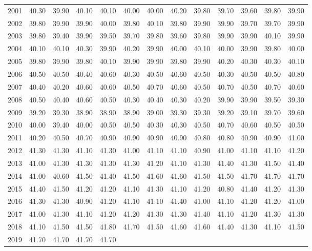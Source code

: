 \begin{longtable}{rrrrrrrrrrrrr}
  2001 & 40.30 & 39.90 & 40.10 & 40.10 & 40.00 & 40.00 & 40.20 & 39.80 & 39.70 & 39.60 & 39.80 & 39.90 \\ 
  2002 & 39.80 & 39.90 & 39.90 & 40.00 & 39.80 & 40.10 & 39.80 & 39.90 & 39.90 & 39.70 & 39.70 & 39.90 \\ 
  2003 & 39.80 & 39.40 & 39.90 & 39.50 & 39.70 & 39.80 & 39.60 & 39.80 & 39.90 & 39.90 & 40.10 & 39.90 \\ 
  2004 & 40.10 & 40.10 & 40.30 & 39.90 & 40.20 & 39.90 & 40.00 & 40.10 & 40.00 & 39.90 & 39.80 & 40.00 \\ 
  2005 & 39.80 & 39.90 & 39.80 & 40.10 & 39.90 & 39.90 & 39.80 & 39.90 & 40.20 & 40.30 & 40.30 & 40.10 \\ 
  2006 & 40.50 & 40.50 & 40.40 & 40.60 & 40.30 & 40.50 & 40.60 & 40.50 & 40.30 & 40.50 & 40.50 & 40.80 \\ 
  2007 & 40.40 & 40.20 & 40.60 & 40.60 & 40.50 & 40.70 & 40.60 & 40.50 & 40.70 & 40.50 & 40.70 & 40.60 \\ 
  2008 & 40.50 & 40.40 & 40.60 & 40.50 & 40.30 & 40.40 & 40.30 & 40.20 & 39.90 & 39.90 & 39.50 & 39.30 \\ 
  2009 & 39.20 & 39.30 & 38.90 & 38.90 & 38.90 & 39.00 & 39.30 & 39.30 & 39.20 & 39.10 & 39.70 & 39.60 \\ 
  2010 & 40.00 & 39.40 & 40.00 & 40.50 & 40.50 & 40.30 & 40.30 & 40.50 & 40.70 & 40.60 & 40.50 & 40.50 \\ 
  2011 & 40.20 & 40.50 & 40.70 & 40.90 & 40.90 & 40.90 & 40.90 & 40.80 & 40.80 & 40.90 & 40.90 & 41.00 \\ 
  2012 & 41.30 & 41.30 & 41.10 & 41.30 & 41.00 & 41.10 & 41.10 & 40.90 & 41.00 & 41.10 & 41.10 & 41.20 \\ 
  2013 & 41.00 & 41.30 & 41.30 & 41.30 & 41.30 & 41.20 & 41.10 & 41.30 & 41.40 & 41.30 & 41.50 & 41.40 \\ 
  2014 & 41.00 & 40.60 & 41.50 & 41.40 & 41.50 & 41.60 & 41.60 & 41.50 & 41.50 & 41.70 & 41.70 & 41.70 \\ 
  2015 & 41.40 & 41.50 & 41.20 & 41.20 & 41.10 & 41.30 & 41.10 & 41.20 & 40.80 & 41.40 & 41.20 & 41.30 \\ 
  2016 & 41.30 & 41.30 & 40.90 & 41.20 & 41.10 & 41.10 & 41.40 & 41.00 & 41.10 & 41.20 & 41.20 & 41.00 \\ 
  2017 & 41.00 & 41.30 & 41.10 & 41.20 & 41.20 & 41.30 & 41.30 & 41.40 & 41.10 & 41.20 & 41.30 & 41.30 \\ 
  2018 & 41.10 & 41.50 & 41.50 & 41.80 & 41.70 & 41.50 & 41.60 & 41.60 & 41.40 & 41.30 & 41.10 & 41.50 \\ 
  2019 & 41.70 & 41.70 & 41.70 & 41.70 &  &  &  &  &  &  &  &  \\ 
   \hline
\hline
\end{longtable}
